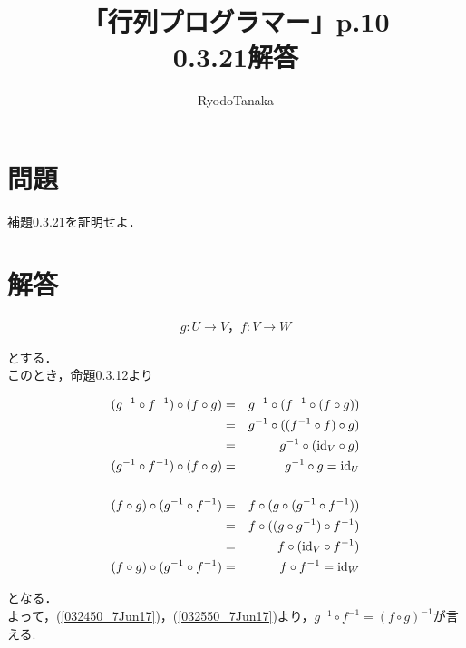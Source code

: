 \documentclass[11pt,a4paper]{jsarticle}
\title{\bf 「行列プログラマー」p.10 \\ 0.3.21解答}
\author{RyodoTanaka}
\date{}
\begin{document}
%
%
\maketitle

\section*{問題}
補題0.3.21を証明せよ．

\section*{解答}

\begin{eqnarray}
g:U→V，f:V→W 
\end{eqnarray}

とする．\\
このとき，命題0.3.12より

\begin{eqnarray}
 (g^{-1}\circ f^{-1})\circ (f\circ g)&=&g^{-1}\circ (f^{-1}\circ (f\circ g)) \nonumber \\
 &=&g^{-1}\circ ((f^{-1}\circ f)\circ g) \nonumber \\
 &=&g^{-1}\circ ({\rm id}_V\circ g) \nonumber \\
 (g^{-1}\circ f^{-1})\circ (f\circ g)&=&g^{-1}\circ g={\rm id}_U\label{032450_7Jun17} \\
 \nonumber \\
 (f\circ g)\circ (g^{-1}\circ f^{-1})&=&f\circ (g\circ (g^{-1}\circ f^{-1})) \nonumber\\
 &=&f\circ ((g\circ g^{-1})\circ f^{-1}) \nonumber \\
 &=&f\circ ({\rm id}_V\circ f^{-1}) \nonumber \\
 (f\circ g)\circ (g^{-1}\circ f^{-1})&=&f\circ f^{-1}={\rm id}_W\label{032550_7Jun17}
\end{eqnarray}

となる．\\
よって，(\ref{032450_7Jun17})，(\ref{032550_7Jun17})より，$g^{-1}\circ f^{-1}=(f\circ g)^{-1}$が言える.
\end{document}
